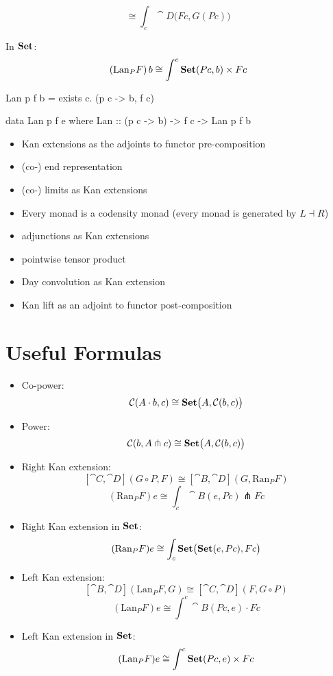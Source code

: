 \documentclass[DaoFP]{subfiles}
\begin{document}
\[ \cong \int_c \cat D \big(F c, G ( P c) \big) \]



In $\mathbf{Set}$:
\[ (\text{Lan}_P F)\, b \cong \int^{c} \mathbf{Set} (P c, b) \times F c \]

 \begin{haskell}
 Lan p f b = exists c. (p c -> b, f c)
 \end{haskell}

 \begin{haskell}
 data Lan p f e where
   Lan :: (p c -> b) -> f c -> Lan p f b
 \end{haskell}
\begin{itemize}

\section{Notes}

\item Kan extensions as the adjoints to functor pre-composition
\item (co-) end representation

\item (co-) limits as Kan extensions

\item Every monad is a codensity monad (every monad is generated by $L \dashv R$)

\item adjunctions as Kan extensions

\item pointwise tensor product

\item Day convolution as Kan extension

\item Kan lift as an adjoint to functor post-composition
\end{itemize}


\section{Useful Formulas}
\begin{itemize}
\item Co-power:
\[ \mathcal{C} (A \cdot b, c) \cong \mathbf{Set} \big( A, \mathcal{C} (b, c)\big) \]
\item Power:
\[ \mathcal{C} (b, A \pitchfork c) \cong \mathbf{Set}  \big(A, \mathcal{C}(b, c)\big) \]
\item Right Kan extension:
\[ [\cat C, \cat D](G \circ P, F) \cong [\cat B, \cat D](G, \text{Ran}_P F) \]
 \[ (\text{Ran}_P F) e \cong \int_c \cat B (e, P c) \pitchfork F c \]
\item Right Kan extension in $\mathbf{Set}$:
  \[ (\text{Ran}_P F) e \cong \int_c \mathbf{Set} \big( \mathbf{Set} (e, P c), F c\big) \]
\item Left Kan extension:
\[ [\cat B, \cat D](\text{Lan}_P F , G) \cong  [\cat C, \cat D] (F, G \circ P) \]
\[ (\text{Lan}_P F) e \cong \int^{c} \cat B(P c, e) \cdot F c \]
\item Left Kan extension in $\mathbf{Set}$:
\[ (\text{Lan}_P F) e \cong \int^{c} \mathbf{Set} (P c, e) \times F c \]

\end{itemize}
\end{document}
